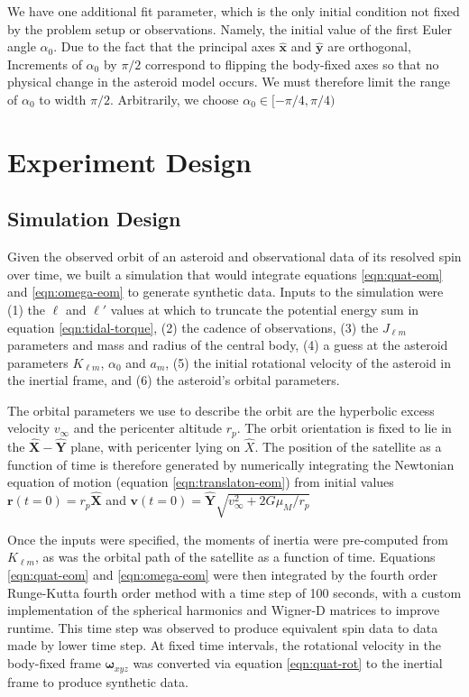 \documentclass[linenumbers]{aastex631}
\newcommand{\unit}[1]{\hat{\mathbf{#1}}}
\begin{document}
We have one additional fit parameter, which is the only initial condition not fixed by the problem setup or observations. Namely, the initial value of the first Euler angle $\alpha_0$. Due to the fact that the principal axes $\unit x$ and $\unit y$ are orthogonal, Increments of $\alpha_0$ by $\pi/2$ correspond to flipping the body-fixed axes so that no physical change in the asteroid model occurs. We must therefore limit the range of $\alpha_0$ to width $\pi/2$. Arbitrarily, we choose $\alpha_0 \in [-\pi/4, \pi/4)$

\section{Experiment Design}
\subsection{Simulation Design}
\label{sec:simulation}
Given the observed orbit of an asteroid and observational data of its resolved spin over time, we built a simulation that would integrate equations \ref{eqn:quat-eom} and \ref{eqn:omega-eom} to generate synthetic data. Inputs to the simulation were (1) the $\ell$ and $\ell'$ values at which to truncate the potential energy sum in equation \ref{eqn:tidal-torque}, (2) the cadence of observations, (3) the $J_{\ell m}$ parameters and mass and radius of the central body, (4) a guess at the asteroid parameters $K_{\ell m}$, $\alpha_0$ and $a_m$, (5) the initial rotational velocity of the asteroid in the inertial frame, and (6) the asteroid's orbital parameters.

The orbital parameters we use to describe the orbit are the hyperbolic excess velocity $v_\infty$ and the pericenter altitude $r_p$. The orbit orientation is fixed to lie in the $\unit X-\unit Y$ plane, with pericenter lying on $\hat X$. The position of the satellite as a function of time is therefore generated by numerically integrating the Newtonian equation of motion (equation \ref{eqn:translaton-eom}) from initial values $\bm r(t=0) = r_p \unit X$ and $\bm v(t=0)=\unit Y \sqrt{v_\infty^2 + 2G\mu_M / r_p}$

Once the inputs were specified, the moments of inertia were pre-computed from $K_{\ell m}$, as was the orbital path of the satellite as a function of time. Equations \ref{eqn:quat-eom} and \ref{eqn:omega-eom} were then integrated by the fourth order Runge-Kutta fourth order method with a time step of 100 seconds, with a custom implementation of the spherical harmonics and Wigner-D matrices to improve runtime. This time step was observed to produce equivalent spin data to data made by lower time step. At fixed time intervals, the rotational velocity in the body-fixed frame $\bm\omega_{xyz}$ was converted via equation \ref{eqn:quat-rot} to the inertial frame to produce synthetic data.
\end{document}
